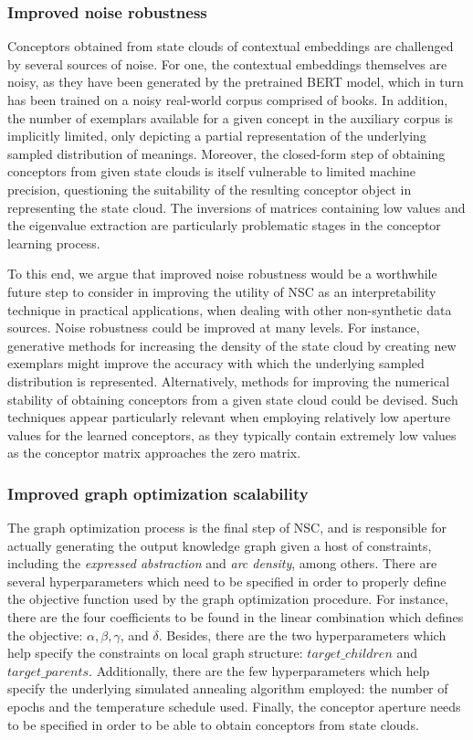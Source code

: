 \subsubsection{Improved noise robustness}

Conceptors obtained from state clouds of contextual embeddings are challenged by several sources of noise. For one, the contextual embeddings themselves are noisy, as they have been generated by the pretrained BERT model, which in turn has been trained on a noisy real-world corpus comprised of books. In addition, the number of exemplars available for a given concept in the auxiliary corpus is implicitly limited, only depicting a partial representation of the underlying sampled distribution of meanings. Moreover, the closed-form step of obtaining conceptors from given state clouds is itself vulnerable to limited machine precision, questioning the suitability of the resulting conceptor object in representing the state cloud. The inversions of matrices containing low values and the eigenvalue extraction are particularly problematic stages in the conceptor learning process.

To this end, we argue that improved noise robustness would be a worthwhile future step to consider in improving the utility of NSC as an interpretability technique in practical applications, when dealing with other non-synthetic data sources. Noise robustness could be improved at many levels. For instance, generative methods for increasing the density of the state cloud by creating new exemplars might improve the accuracy with which the underlying sampled distribution is represented. Alternatively, methods for improving the numerical stability of obtaining conceptors from a given state cloud could be devised. Such techniques appear particularly relevant when employing relatively low aperture values for the learned conceptors, as they typically contain extremely low values as the conceptor matrix approaches the zero matrix.

\subsubsection{Improved graph optimization scalability}

The graph optimization process is the final step of NSC, and is responsible for actually generating the output knowledge graph given a host of constraints, including the \textit{expressed abstraction} and \textit{arc density}, among others. There are several hyperparameters which need to be specified in order to properly define the objective function used by the graph optimization procedure. For instance, there are the four coefficients to be found in the linear combination which defines the objective: $\alpha, \beta, \gamma$, and $\delta$. Besides, there are the two hyperparameters which help specify the constraints on local graph structure: $target\_children$ and $target\_parents$. Additionally, there are the few hyperparameters which help specify the underlying simulated annealing algorithm employed: the number of epochs and the temperature schedule used. Finally, the conceptor aperture needs to be specified in order to be able to obtain conceptors from state clouds.

